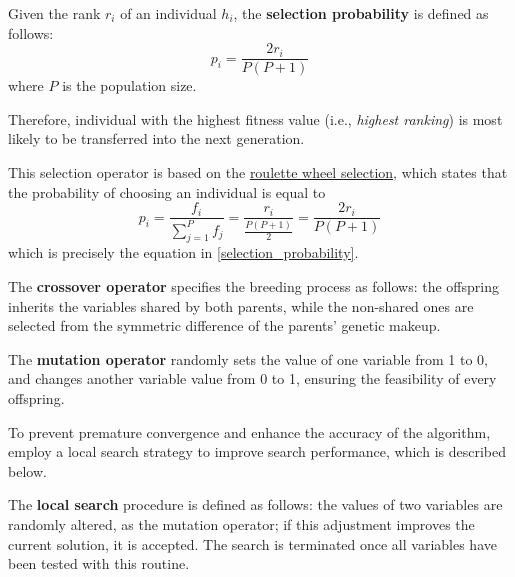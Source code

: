 \begin{definition} \label{selection_probability}
    Given the rank $r_i$ of an individual $h_i$, the \textbf{selection probability} is defined as follows: $$p_i = \dfrac{2r_i}{P(P + 1)}$$ where $P$ is the population size.
\end{definition}

Therefore, individual with the highest fitness value (i.e., \textit{highest ranking}) is most likely to be transferred into the next generation.

This selection operator is based on the \href{https://en.wikipedia.org/wiki/Selection_(genetic_algorithm)#Roulette_wheel_selection}{roulette wheel selection}, which states that the probability of choosing an individual is equal to $$p_i = \dfrac{f_i}{\sum_{j = 1}^P {f_j}} = \dfrac{r_i}{\frac{P(P + 1)}{2}} = \dfrac{2r_i}{P(P+1)}$$ which is precisely the equation in \cref{selection_probability}.

\begin{definition}
    The \textbf{crossover operator} specifies the breeding process as follows: the offspring inherits the variables shared by both parents, while the non-shared ones are selected from the symmetric difference of the parents' genetic makeup.
\end{definition}

\begin{definition}
    The \textbf{mutation operator} randomly sets the value of one variable from 1 to 0, and changes another variable value from 0 to 1, ensuring the feasibility of every offspring.
\end{definition}

To prevent premature convergence and enhance the accuracy of the algorithm, \textcite{mdpfinder} employ a local search strategy to improve search performance, which is described below.

\begin{definition}
    The \textbf{local search} procedure is defined as follows: the values of two variables are randomly altered, as the mutation operator; if this adjustment improves the current solution, it is accepted. The search is terminated once all variables have been tested with this routine.
\end{definition}

